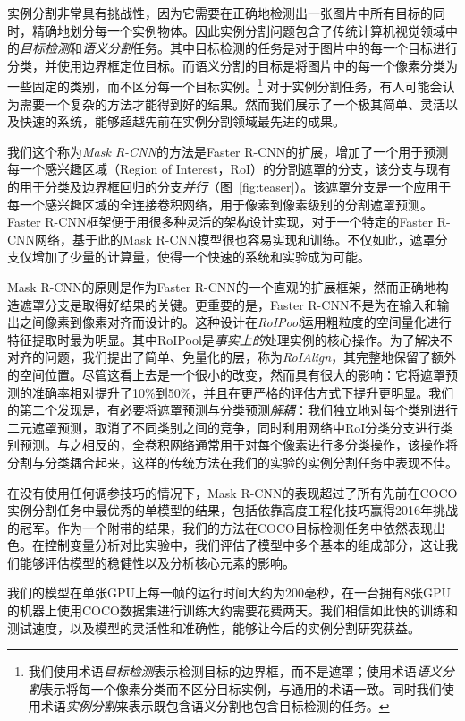 实例分割非常具有挑战性，因为它需要在正确地检测出一张图片中所有目标的同时，精确地划分每一个实例物体。因此实例分割问题包含了传统计算机视觉领域中的\emph{目标检测}和\emph{语义分割}任务。其中目标检测的任务是对于图片中的每一个目标进行分类，并使用边界框定位目标。而语义分割的目标是将图片中的每一个像素分类为一些固定的类别，而不区分每一个目标实例。\footnote{我们使用术语\emph{目标检测}表示检测目标的边界框，而不是遮罩；使用术语\emph{语义分割}表示将每一个像素分类而不区分目标实例，与通用的术语一致。同时我们使用术语\emph{实例分割}来表示既包含语义分割也包含目标检测的任务。} 对于实例分割任务，有人可能会认为需要一个复杂的方法才能得到好的结果。然而我们展示了一个极其简单、灵活以及快速的系统，能够超越先前在实例分割领域最先进的成果。

我们这个称为\emph{Mask R-CNN}的方法是Faster R-CNN的扩展，增加了一个用于预测每一个感兴趣区域（Region of Interest，RoI）的分割遮罩的分支，该分支与现有的用于分类及边界框回归的分支\emph{并行}（图~\ref{fig:teaser}）。该遮罩分支是一个应用于每一个感兴趣区域的全连接卷积网络，用于像素到像素级别的分割遮罩预测。Faster R-CNN框架便于用很多种灵活的架构设计实现，对于一个特定的Faster R-CNN网络，基于此的Mask R-CNN模型很也容易实现和训练。不仅如此，遮罩分支仅增加了少量的计算量，使得一个快速的系统和实验成为可能。

Mask R-CNN的原则是作为Faster R-CNN的一个直观的扩展框架，然而正确地构造遮罩分支是取得好结果的关键。更重要的是，Faster R-CNN不是为在输入和输出之间像素到像素对齐而设计的。这种设计在\emph{RoIPool}运用粗粒度的空间量化进行特征提取时最为明显。其中RoIPool是\emph{事实上的}处理实例的核心操作。为了解决不对齐的问题，我们提出了简单、免量化的层，称为\emph{RoIAlign}，其完整地保留了额外的空间位置。尽管这看上去是一个很小的改变，然而具有很大的影响：它将遮罩预测的准确率相对提升了10\%到50\%，并且在更严格的评估方式下提升更明显。我们的第二个发现是，有必要将遮罩预测与分类预测\emph{解耦}：我们独立地对每个类别进行二元遮罩预测，取消了不同类别之间的竞争，同时利用网络中RoI分类分支进行类别预测。与之相反的，全卷积网络通常用于对每个像素进行多分类操作，该操作将分割与分类耦合起来，这样的传统方法在我们的实验的实例分割任务中表现不佳。

在没有使用任何调参技巧的情况下，Mask R-CNN的表现超过了所有先前在COCO实例分割任务中最优秀的单模型的结果，包括依靠高度工程化技巧赢得2016年挑战的冠军。作为一个附带的结果，我们的方法在COCO目标检测任务中依然表现出色。在控制变量分析对比实验中，我们评估了模型中多个基本的组成部分，这让我们能够评估模型的稳健性以及分析核心元素的影响。

我们的模型在单张GPU上每一帧的运行时间大约为200毫秒，在一台拥有8张GPU的机器上使用COCO数据集进行训练大约需要花费两天。我们相信如此快的训练和测试速度，以及模型的灵活性和准确性，能够让今后的实例分割研究获益。

